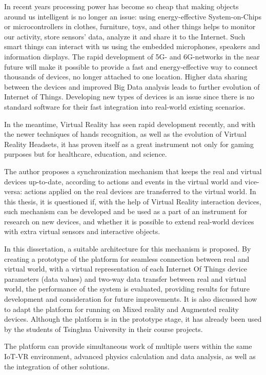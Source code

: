 \begin{abstract*}

  In recent years processing power has become so cheap that making objects around us intelligent is no longer an issue: using energy-effective System-on-Chips or microcontrollers in clothes, furniture, toys, and other things helps to monitor our activity, store sensors' data, analyze it and share it to the Internet. Such smart things can interact with us using the embedded microphones, speakers and information displays. The rapid development of 5G- and 6G-networks in the near future will make it possible to provide a fast and energy-effective way to connect thousands of devices, no longer attached to one location. Higher data sharing between the devices and improved Big Data analysis leads to further evolution of Internet of Things. Developing new types of devices is an issue since there is no standard software for  their fast integration into real-world existing scenarios.
   
  In the meantime, Virtual Reality has seen rapid development recently, and with the newer techniques of hands recognition, as well as the evolution of Virtual Reality Headsets, it has proven itself as a great instrument not only for gaming purposes but for healthcare, education, and science.
   
  The author proposes a synchronization mechanism that keeps the real and virtual devices up-to-date, according to actions and events in the virtual world and vice-versa: actions applied on the real devices are transferred to the virtual world. In this thesis, it is questioned if, with the help of Virtual Reality interaction devices, such mechanism can be developed and be used as a part of an instrument for research on new devices, and whether it is possible to extend real-world devices with extra virtual sensors and interactive objects.
  
  In this dissertation, a suitable architecture for this mechanism is proposed. By creating a prototype of the platform for seamless connection between real and virtual world, with a virtual representation of each Internet Of Things device parameters (data values) and two-way data transfer between real and virtual world, the performance of the system is evaluated, providing results for future development and consideration for future improvements. It is also discussed how to adapt the platform for running on Mixed reality and Augmented reality devices. Although the platform is in the prototype stage, it has already been used by the students of Tsinghua University in their course projects. 
  
  The platform can provide simultaneous work of multiple users within the same IoT-VR environment, advanced physics calculation and data analysis, as well as the integration of other solutions.
 


\end{abstract*}
